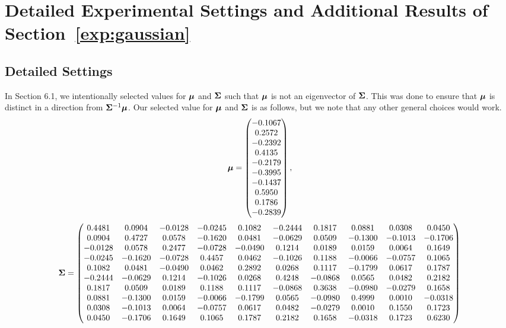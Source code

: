 \section{Detailed Experimental Settings and Additional Results of Section~\ref{exp:gaussian}}\label{additional_reults}

\subsection{Detailed Settings }\label{setting:gaussian}
In Section 6.1, we intentionally selected values for ${\bm{\mu}}$ and ${\bm{\Sigma}}$ such that ${\bm{\mu}}$ is not an eigenvector of ${\bm{\Sigma}}$. This was done to ensure that ${\bm{\mu}}$ is distinct in a direction from ${\bm{\Sigma}}^{-1} {\bm{\mu}}$. Our selected value for ${\bm{\mu}}$ and ${\bm{\Sigma}}$ is as follows, but we note that any other general choices would work.
\begin{equation*} {\bm{\mu}} = \begin{pmatrix} -0.1067\\ 0.2572\\ -0.2392\\ 0.4135\\ -0.2179\\ -0.3995\\ -0.1437\\ 0.5950\\ 0.1786\\ -0.2839
\end{pmatrix},
\end{equation*}
\begin{align*}
{\bm{\Sigma}} =
\begin{pmatrix} 
0.4481& 0.0904& -0.0128& -0.0245& 0.1082& -0.2444& 0.1817& 0.0881& 0.0308& 0.0450\\ 
0.0904& 0.4727& 0.0578& -0.1620& 0.0481& -0.0629& 0.0509& -0.1300& -0.1013& -0.1706\\
-0.0128& 0.0578& 0.2477& -0.0728& -0.0490& 0.1214& 0.0189& 0.0159& 0.0064& 0.1649\\
-0.0245& -0.1620& -0.0728& 0.4457& 0.0462& -0.1026& 0.1188& -0.0066& -0.0757& 0.1065\\
0.1082& 0.0481& -0.0490& 0.0462& 0.2892& 0.0268& 0.1117& -0.1799& 0.0617& 0.1787\\
-0.2444& -0.0629& 0.1214& -0.1026& 0.0268& 0.4248& -0.0868& 0.0565& 0.0482& 0.2182\\
0.1817& 0.0509& 0.0189& 0.1188& 0.1117& -0.0868& 0.3638& -0.0980& -0.0279& 0.1658\\
0.0881& -0.1300& 0.0159& -0.0066& -0.1799& 0.0565& -0.0980& 0.4999& 0.0010& -0.0318\\
0.0308& -0.1013& 0.0064& -0.0757& 0.0617& 0.0482& -0.0279& 0.0010& 0.1550& 0.1723\\
0.0450& -0.1706& 0.1649& 0.1065& 0.1787& 0.2182& 0.1658& -0.0318& 0.1723& 0.6230
\end{pmatrix}
\end{align*}


